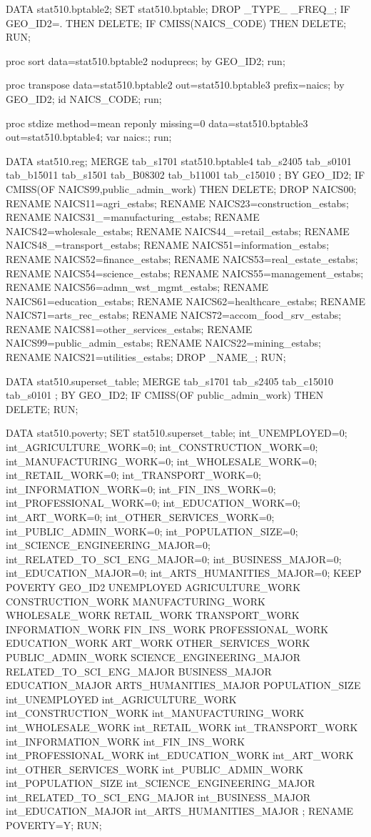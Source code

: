 \begin{SAScode}
DATA stat510.bptable2;
SET stat510.bptable;
DROP _TYPE_ _FREQ_;
IF GEO_ID2=. THEN DELETE;
IF CMISS(NAICS_CODE) THEN DELETE;
RUN;

proc sort data=stat510.bptable2 noduprecs;
by GEO_ID2;
run;

proc transpose data=stat510.bptable2 out=stat510.bptable3
prefix=naics;
by GEO_ID2;
id NAICS_CODE;
run;

proc stdize method=mean reponly missing=0 data=stat510.bptable3 out=stat510.bptable4;
  var naics:;
  run;
  
DATA stat510.reg;
MERGE tab_s1701
stat510.bptable4 
tab_s2405 
tab_s0101  
tab_b15011 
tab_s1501 
tab_B08302 
tab_b11001 
tab_c15010
;
BY GEO_ID2;
IF CMISS(OF NAICS99,public_admin_work) THEN DELETE;
DROP NAICS00;
RENAME NAICS11=agri_estabs;
RENAME NAICS23=construction_estabs;
RENAME NAICS31_=manufacturing_estabs;
RENAME NAICS42=wholesale_estabs;
RENAME NAICS44_=retail_estabs;
RENAME NAICS48_=transport_estabs;
RENAME NAICS51=information_estabs;
RENAME NAICS52=finance_estabs;
RENAME NAICS53=real_estate_estabs;
RENAME NAICS54=science_estabs;
RENAME NAICS55=management_estabs;
RENAME NAICS56=admn_wst_mgmt_estabs;
RENAME NAICS61=education_estabs;
RENAME NAICS62=healthcare_estabs;
RENAME NAICS71=arts_rec_estabs;
RENAME NAICS72=accom_food_srv_estabs;
RENAME NAICS81=other_services_estabs;
RENAME NAICS99=public_admin_estabs;
RENAME NAICS22=mining_estabs;
RENAME NAICS21=utilities_estabs;
DROP _NAME_;
RUN;


DATA stat510.superset_table;
MERGE tab_s1701
tab_s2405 
tab_c15010
tab_s0101
;
BY GEO_ID2;
IF CMISS(OF public_admin_work) THEN DELETE;
RUN;

DATA stat510.poverty;
SET stat510.superset_table;
int_UNEMPLOYED=0;
int_AGRICULTURE_WORK=0;
int_CONSTRUCTION_WORK=0;
int_MANUFACTURING_WORK=0;
int_WHOLESALE_WORK=0;
int_RETAIL_WORK=0;
int_TRANSPORT_WORK=0;
int_INFORMATION_WORK=0;
int_FIN_INS_WORK=0;
int_PROFESSIONAL_WORK=0;
int_EDUCATION_WORK=0;
int_ART_WORK=0;
int_OTHER_SERVICES_WORK=0;
int_PUBLIC_ADMIN_WORK=0;
int_POPULATION_SIZE=0;
int_SCIENCE_ENGINEERING_MAJOR=0;
int_RELATED_TO_SCI_ENG_MAJOR=0;
int_BUSINESS_MAJOR=0;
int_EDUCATION_MAJOR=0;
int_ARTS_HUMANITIES_MAJOR=0;
KEEP POVERTY
GEO_ID2
	UNEMPLOYED
	AGRICULTURE_WORK
	CONSTRUCTION_WORK
	MANUFACTURING_WORK
	WHOLESALE_WORK
	RETAIL_WORK
	TRANSPORT_WORK
	INFORMATION_WORK
	FIN_INS_WORK
	PROFESSIONAL_WORK
	EDUCATION_WORK
	ART_WORK
	OTHER_SERVICES_WORK
	PUBLIC_ADMIN_WORK
	SCIENCE_ENGINEERING_MAJOR
	RELATED_TO_SCI_ENG_MAJOR
	BUSINESS_MAJOR
	EDUCATION_MAJOR
	ARTS_HUMANITIES_MAJOR
	POPULATION_SIZE
int_UNEMPLOYED
int_AGRICULTURE_WORK
int_CONSTRUCTION_WORK
int_MANUFACTURING_WORK
int_WHOLESALE_WORK
int_RETAIL_WORK
int_TRANSPORT_WORK
int_INFORMATION_WORK
int_FIN_INS_WORK
int_PROFESSIONAL_WORK
int_EDUCATION_WORK
int_ART_WORK
int_OTHER_SERVICES_WORK
int_PUBLIC_ADMIN_WORK
int_POPULATION_SIZE
int_SCIENCE_ENGINEERING_MAJOR
int_RELATED_TO_SCI_ENG_MAJOR
int_BUSINESS_MAJOR
int_EDUCATION_MAJOR
int_ARTS_HUMANITIES_MAJOR
	;
RENAME POVERTY=Y;
RUN;


\end{SAScode}
